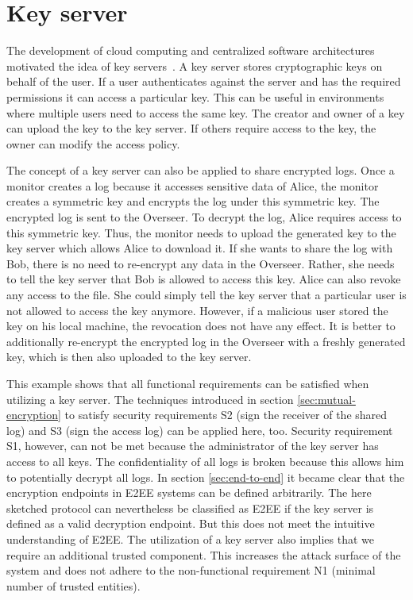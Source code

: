 \documentclass[../main.tex]{subfiles}
\begin{document}
\section{Key server}
\label{sec:key-server}
The development of cloud computing and centralized software architectures motivated the idea of key servers~\cite{Seitz2003}.
A key server stores cryptographic keys on behalf of the user.
If a user authenticates against the server and has the required permissions it can access a particular key.
This can be useful in environments where multiple users need to access the same key.
The creator and owner of a key can upload the key to the key server.
If others require access to the key, the owner can modify the access policy.

The concept of a key server can also be applied to share encrypted logs.
Once a monitor creates a log because it accesses sensitive data of Alice, the monitor creates a symmetric key and encrypts the log under this symmetric key.
The encrypted log is sent to the Overseer.
To decrypt the log, Alice requires access to this symmetric key.
Thus, the monitor needs to upload the generated key to the key server which allows Alice to download it.
If she wants to share the log with Bob, there is no need to re-encrypt any data in the Overseer.
Rather, she needs to tell the key server that Bob is allowed to access this key.
Alice can also revoke any access to the file.
She could simply tell the key server that a particular user is not allowed to access the key anymore.
However, if a malicious user stored the key on his local machine, the revocation does not have any effect.
It is better to additionally re-encrypt the encrypted log in the Overseer with a freshly generated key, which is then also uploaded to the key server.

This example shows that all functional requirements can be satisfied when utilizing a key server.
The techniques introduced in section \ref{sec:mutual-encryption} to satisfy security requirements S2 (sign the receiver of the shared log) and S3 (sign the access log) can be applied here, too.
Security requirement S1, however, can not be met because the administrator of the key server has access to all keys.
The confidentiality of all logs is broken because this allows him to potentially decrypt all logs.
In section \ref{sec:end-to-end} it became clear that the encryption endpoints in E2EE systems can be defined arbitrarily.
The here sketched protocol can nevertheless be classified as E2EE if the key server is defined as a valid decryption endpoint.
But this does not meet the intuitive understanding of E2EE.
The utilization of a key server also implies that we require an additional trusted component.
This increases the attack surface of the system and does not adhere to the non-functional requirement N1 (minimal number of trusted entities).
\end{document}
